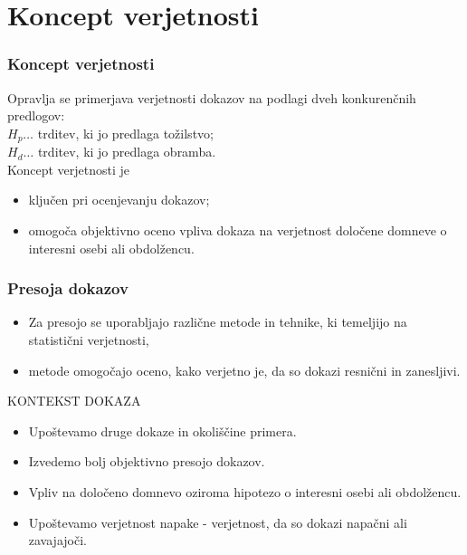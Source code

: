 \documentclass{beamer}
\begin{document}
\section{Koncept verjetnosti}

\begin{frame}
    \frametitle{Koncept verjetnosti}
    Opravlja se primerjava verjetnosti dokazov na podlagi dveh konkurenčnih predlogov:\\
    $H_p \dots$ trditev, ki jo predlaga tožilstvo;\\
    $H_d \dots$ trditev, ki jo predlaga obramba.\\ \vspace{5mm}
    Koncept verjetnosti je
    \begin{itemize}
        \item ključen pri ocenjevanju dokazov;
        \item omogoča objektivno oceno vpliva dokaza na verjetnost določene domneve o interesni osebi ali obdolžencu.
    \end{itemize}
\end{frame}

\begin{frame}
    \frametitle{Presoja dokazov}
    \begin{itemize}
        \item Za presojo se uporabljajo različne metode in tehnike, ki temeljijo na statistični verjetnosti,
        \item metode omogočajo oceno, kako verjetno je, da so dokazi resnični in zanesljivi. 
    \end{itemize}
    \begin{beamerboxesrounded}[]{KONTEKST DOKAZA}
        \begin{itemize}
            \item Upoštevamo druge dokaze in okoliščine primera.
            \item Izvedemo bolj objektivno presojo dokazov.
            \item Vpliv na določeno domnevo oziroma hipotezo o interesni osebi ali obdolžencu.
            \item Upoštevamo verjetnost napake - verjetnost, da so dokazi napačni ali zavajajoči.
        \end{itemize} 
    \end{beamerboxesrounded}
\end{frame}
\end{document}
